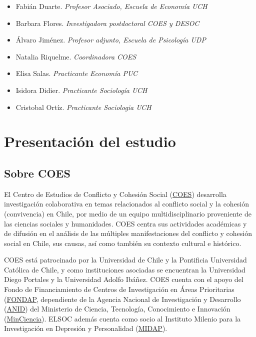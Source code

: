 \documentclass[
  12pt,
]{book}
\providecommand{\tightlist}{%
  \setlength{\itemsep}{0pt}\setlength{\parskip}{0pt}}
\begin{document}
\begin{itemize}
\tightlist
\item
  Fabián Duarte. \emph{Profesor Asociado, Escuela de Economía UCH}
\item
  Barbara Flores. \emph{Investigadora postdoctoral COES y DESOC}
\item
  Álvaro Jiménez. \emph{Profesor adjunto, Escuela de Psicología UDP}
\item
  Natalia Riquelme. \emph{Coordinadora COES}
\item
  Elisa Salas. \emph{Practicante Economía PUC}
\item
  Isidora Didier. \emph{Practicante Sociología UCH}
\item
  Cristobal Ortíz. \emph{Practicante Sociologia UCH}
\end{itemize}

\hypertarget{presentaciuxf3n-del-estudio}{%
\chapter{Presentación del estudio}\label{presentaciuxf3n-del-estudio}}

\hypertarget{sobre-coes}{%
\section*{Sobre COES}\label{sobre-coes}}

El Centro de Estudios de Conflicto y Cohesión Social (\href{https://coes.cl/}{COES}) desarrolla investigación colaborativa en temas relacionados al conflicto social y la cohesión (convivencia) en Chile, por medio de un equipo multidisciplinario proveniente de las ciencias sociales y humanidades. COES centra sus actividades académicas y de difusión en el análisis de las múltiples manifestaciones del conflicto y cohesión social en Chile, sus causas, así como también su contexto cultural e histórico.

COES está patrocinado por la Universidad de Chile y la Pontificia Universidad Católica de Chile, y como instituciones asociadas se encuentran la Universidad Diego Portales y la Universidad Adolfo Ibáñez. COES cuenta con el apoyo del Fondo de Financiamiento de Centros de Investigación en Áreas Prioritarias (\href{https://www.conicyt.cl/fondap/sobre-fondap/que-es-fondap/}{FONDAP}, dependiente de la Agencia Nacional de Investigación y Desarrollo (\href{https://www.anid.cl/}{ANID}) del Ministerio de Ciencia, Tecnología, Conocimiento e Innovación (\href{https://www.minciencia.gob.cl/}{MinCiencia}). ELSOC además cuenta como socio al Instituto Milenio para la Investigación en Depresión y Personalidad (\href{https://midap.org/}{MIDAP}).
\end{document}
